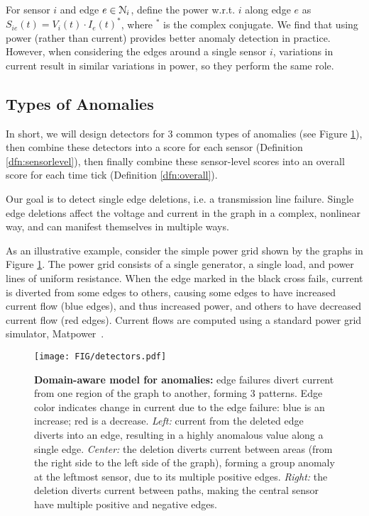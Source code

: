 For sensor $i$ and edge $e \in \mathcal{N}_i$, define the power w.r.t. $i$ along edge $e$ as $S_{ie}(t) = V_i(t) \cdot I_e(t)^*$, where $^*$ is the complex conjugate. We find that using power (rather than current) provides better anomaly detection in practice. However, when considering the edges around a single sensor $i$, variations in current result in similar variations in power, so they perform the same role. 


\label{sec:anomaly}

\subsection{Types of Anomalies}
In short, we will design detectors for 3 common types of anomalies (see Figure \ref{fig:detectors}), then combine these detectors into a score for each sensor (Definition \ref{dfn:sensorlevel}), then finally combine these sensor-level scores into an overall score for each time tick (Definition \ref{dfn:overall}). 

Our goal is to detect single edge deletions, i.e. a transmission line failure. Single edge deletions affect the voltage and current in the graph in a complex, nonlinear way, and can manifest themselves in multiple ways. 

As an illustrative example, consider the simple power grid shown by the graphs in Figure \ref{fig:detectors}. The power grid consists of a single generator, a single load, and power lines of uniform resistance. When the edge marked in the black cross fails, current is diverted from some edges to others, causing some edges to have increased current flow (blue edges), and thus increased power, and others to have decreased current flow (red edges). Current flows are computed using a standard power grid simulator, Matpower~\cite{zimmerman2011matpower}. 
\begin{figure}[ht]
    \centering
       \texttt{[image: FIG/detectors.pdf]} 
    \caption{\textbf{Domain-aware model for anomalies:} edge failures divert current from one region of the graph to another, forming 3 patterns. Edge color indicates change in current due to the edge failure: blue is an increase; red is a decrease. {\it Left:} current from the deleted edge diverts into an edge, resulting in a highly anomalous value along a single edge. {\it Center:} the deletion diverts current between areas (from the right side to the left side of the graph), forming a group anomaly at the leftmost sensor, due to its multiple positive edges. {\it Right:} the deletion diverts current between paths, making the central sensor have multiple positive and negative edges. \label{fig:detectors} }
\end{figure} 

